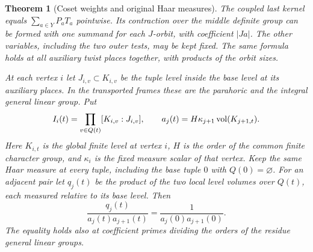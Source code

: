 \documentclass[a4paper,11pt]{article}
\newtheorem{theorem}[proposition]{Theorem}
\theoremstyle{definition}
\theoremstyle{remark}
\numberwithin{equation}{section}
\begin{document}
\begin{theorem}[Coset weights and original Haar measures]\leavevmode
\label{thm:adjacent321}
The coupled last kernel equals \(\sum_{a\in Y}P_aT_a\)
pointwise. Its contraction over the middle definite group
can be formed with one summand for each \(J\)-orbit, with
coefficient \(|Ja|\). The other variables, including the
two outer tests, may be kept fixed. The same formula holds
at all auxiliary twist places together, with products of
the orbit sizes.

At each vertex \(i\) let \(J_{i,v}\subset K_{i,v}\) be the
tuple level inside the base level at its auxiliary places.
In the transported frames these are the parahoric and the
integral general linear group. Put
\[
 I_i(t)=\prod_{v\in Q(t)}[K_{i,v}:J_{i,v}],
 \qquad a_j(t)=H\kappa_{j+1}\,{\rm vol}(K_{j+1,t}).
\]
Here \(K_{i,t}\) is the global finite level at vertex \(i\),
\(H\) is the order of the common finite character group, and
\(\kappa_i\) is the fixed measure scalar of that vertex.
Keep the same Haar measure at every tuple, including the
base tuple \(0\) with \(Q(0)=\varnothing\).
For an adjacent pair let \(q_j(t)\) be the product of the
two local level volumes over \(Q(t)\), each measured relative
to its base level. Then
\[
 \frac{q_j(t)}{a_j(t)a_{j+1}(t)}
             = \frac{1}{a_j(0)a_{j+1}(0)} .
\]
The equality holds also at coefficient primes dividing the
orders of the residue general linear groups.
\end{theorem}
\end{document}
